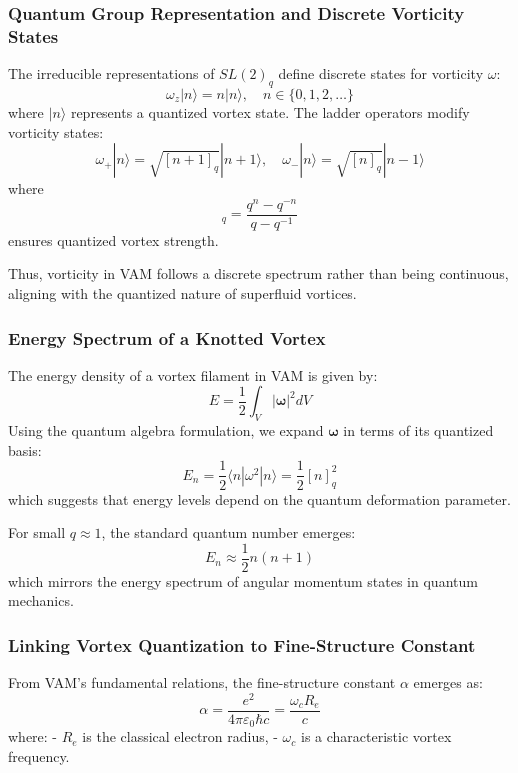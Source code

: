 \subsubsection*{Quantum Group Representation and Discrete Vorticity States}
The irreducible representations of $SL(2)_q$ define discrete states for vorticity $\omega$:
\begin{equation}
    \omega_z |n\rangle = n |n\rangle, \quad n \in \{0, 1, 2, \dots\}
\end{equation}
where $|n\rangle$ represents a quantized vortex state. The ladder operators modify vorticity states:
\begin{equation}
    \omega_+ |n\rangle = \sqrt{[n+1]_q} |n+1\rangle, \quad \omega_- |n\rangle = \sqrt{[n]_q} |n-1\rangle
\end{equation}
where
\begin{equation}
[n]_q = \frac{q^n - q^{-n}}{q - q^{-1}}
\end{equation}
ensures quantized vortex strength.

Thus, vorticity in VAM follows a discrete spectrum rather than being continuous, aligning with the quantized nature of superfluid vortices.

\subsubsection*{Energy Spectrum of a Knotted Vortex}
The energy density of a vortex filament in VAM is given by:
\begin{equation}
    E = \frac{1}{2} \int_V |\boldsymbol{\omega}|^2 dV
\end{equation}
Using the quantum algebra formulation, we expand $\boldsymbol{\omega}$ in terms of its quantized basis:
\begin{equation}
    E_n = \frac{1}{2} \langle n | \omega^2 | n \rangle = \frac{1}{2} [n]_q^2
\end{equation}
which suggests that energy levels depend on the quantum deformation parameter.

For small $q \approx 1$, the standard quantum number emerges:
\begin{equation}
    E_n \approx \frac{1}{2} n(n+1)
\end{equation}
which mirrors the energy spectrum of angular momentum states in quantum mechanics.

\subsubsection*{Linking Vortex Quantization to Fine-Structure Constant}
From VAM's fundamental relations, the fine-structure constant $\alpha$ emerges as:
\begin{equation}
    \alpha = \frac{e^2}{4\pi \varepsilon_0 \hbar c} = \frac{\omega_c R_e}{c}
\end{equation}
where:
- $R_e$ is the classical electron radius,
- $\omega_c$ is a characteristic vortex frequency.

